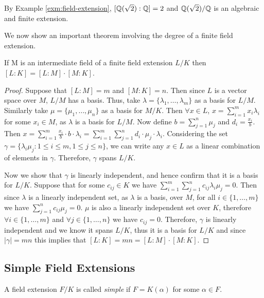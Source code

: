 \begin{example}
	 By Example \ref{exm:field-extension}, $[\mathbb Q(\sqrt 2): \mathbb Q] = 2$ and $\mathbb Q(\sqrt 2) / \mathbb Q$ is an algebraic and finite extension.
\end{example}

We now show an important theorem involving the degree of a finite field extension. 

\begin{theorem} \label{thm:tower-theorem}
    If M is an intermediate field of a finite field extension $L/K$ then
$
    [L:K] = [L:M]\cdot[M:K]
$. 
\end{theorem}
\begin{proof}
Suppose that $[L:M]=m$ and $[M:K]=n$. Then since $L$ is a vector space over $M$, $L/M$ has a basis. Thus, take $\lambda = \{\lambda_1,\dots,\lambda_m\}$ as a basis for $L/M$. Similarly take $\mu = \{\mu_1,\dots,\mu_n\}$ as a basis for $M/K$. Then $\forall x \in L$, $x = \sum^m_{i=1}x_i\lambda_i$ for some $x_i \in M$, as $\lambda$ is a basis for $L/M$. Now define $b=\sum^n_{j=1}\mu_j$ and $d_i=\frac{x_i}{b}$. Then $x=\sum^m_{i=1}\frac{x_i}{b}\cdot b \cdot \lambda_i = \sum^m_{i=1}\sum^n_{j=1}d_i\cdot \mu_j \cdot \lambda_i$. Considering the set $\gamma=\{\lambda_i\mu_j : 1\leq i \leq m, 1\leq j \leq n\}$, we can write any $x \in L$ as a linear combination of elements in $\gamma$. Therefore, $\gamma$ spans $L/K$.

Now we show that $\gamma$ is linearly independent, and hence confirm that it is a basis for $L/K$. Suppose that for some $c_{ij} \in K$ we have $\sum^m_{i=1} \sum^n_{j=1} c_{ij}\lambda_i\mu_j = 0 $. Then since $\lambda$ is a linearly independent set, as $\lambda$ is a basis, over $M$, for all $i \in \{1,\dots,m\}$ we have $\sum^n_{j=1} c_{ij}\mu_j = 0 $. $\mu$ is also a linearly independent set over $K$, therefore $\forall i \in \{1,\dots,m\}$ and $\forall j \in \{1,\dots,n\}$ we have $c_{ij} = 0$. Therefore, $\gamma$ is linearly independent and we  know it spans $L/K$, thus it is a basis for $L/K$ and since $|\gamma|=mn$ this implies that $[L:K] = mn = [L:M]\cdot[M:K]$.
\end{proof}

\subsection{Simple Field Extensions}
\begin{definition}
A field extension $F/K$ is called \textit{simple} if \(F = K(\alpha)\) for some \(\alpha \in F\).
\end{definition}

